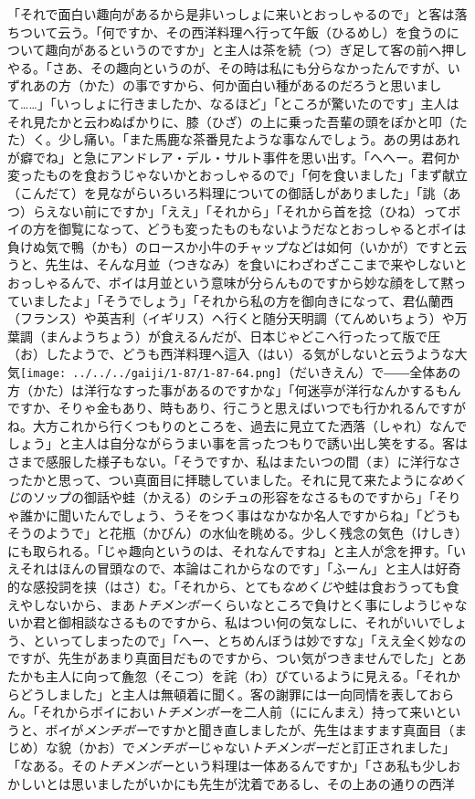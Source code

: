 「それで面白い趣向があるから是非いっしょに来いとおっしゃるので」と客は落ちついて云う。「何ですか、その西洋料理へ行って午飯（ひるめし）を食うのについて趣向があるというのですか」と主人は茶を続（つ）ぎ足して客の前へ押しやる。「さあ、その趣向というのが、その時は私にも分らなかったんですが、いずれあの方（かた）の事ですから、何か面白い種があるのだろうと思いまして\ldots{}\ldots{}」「いっしょに行きましたか、なるほど」「ところが驚いたのです」主人はそれ見たかと云わぬばかりに、膝（ひざ）の上に乗った吾輩の頭をぽかと叩（たた）く。少し痛い。「また馬鹿な茶番見たような事なんでしょう。あの男はあれが癖でね」と急にアンドレア・デル・サルト事件を思い出す。「へへー。君何か変ったものを食おうじゃないかとおっしゃるので」「何を食いました」「まず献立（こんだて）を見ながらいろいろ料理についての御話しがありました」「誂（あつ）らえない前にですか」「ええ」「それから」「それから首を捻（ひね）ってボイの方を御覧になって、どうも変ったものもないようだなとおっしゃるとボイは負けぬ気で鴨（かも）のロースか小牛のチャップなどは如何（いかが）ですと云うと、先生は、そんな月並（つきなみ）を食いにわざわざここまで来やしないとおっしゃるんで、ボイは月並という意味が分らんものですから妙な顔をして黙っていましたよ」「そうでしょう」「それから私の方を御向きになって、君仏蘭西（フランス）や英吉利（イギリス）へ行くと随分天明調（てんめいちょう）や万葉調（まんようちょう）が食えるんだが、日本じゃどこへ行ったって版で圧（お）したようで、どうも西洋料理へ這入（はい）る気がしないと云うような大気\texttt{[image: ../../../gaiji/1-87/1-87-64.png]}（だいきえん）で――全体あの方（かた）は洋行なすった事があるのですかな」「何迷亭が洋行なんかするもんですか、そりゃ金もあり、時もあり、行こうと思えばいつでも行かれるんですがね。大方これから行くつもりのところを、過去に見立てた洒落（しゃれ）なんでしょう」と主人は自分ながらうまい事を言ったつもりで誘い出し笑をする。客はさまで感服した様子もない。「そうですか、私はまたいつの間（ま）に洋行なさったかと思って、つい真面目に拝聴していました。それに見て来たように\emph{なめくじ}のソップの御話や蛙（かえる）のシチュの形容をなさるものですから」「そりゃ誰かに聞いたんでしょう、うそをつく事はなかなか名人ですからね」「どうもそうのようで」と花瓶（かびん）の水仙を眺める。少しく残念の気色（けしき）にも取られる。「じゃ趣向というのは、それなんですね」と主人が念を押す。「いえそれはほんの冒頭なので、本論はこれからなのです」「ふーん」と主人は好奇的な感投詞を挟（はさ）む。「それから、とても\emph{なめくじ}や蛙は食おうっても食えやしないから、まあ\emph{トチメンボー}くらいなところで負けとく事にしようじゃないか君と御相談なさるものですから、私はつい何の気なしに、それがいいでしょう、といってしまったので」「へー、とちめんぼうは妙ですな」「ええ全く妙なのですが、先生があまり真面目だものですから、つい気がつきませんでした」とあたかも主人に向って麁忽（そこつ）を詫（わ）びているように見える。「それからどうしました」と主人は無頓着に聞く。客の謝罪には一向同情を表しておらん。「それからボイにおい\emph{トチメンボー}を二人前（ににんまえ）持って来いというと、ボイが\emph{メンチボー}ですかと聞き直しましたが、先生はますます真面目（まじめ）な貌（かお）で\emph{メンチボー}じゃない\emph{トチメンボー}だと訂正されました」「なある。その\emph{トチメンボー}という料理は一体あるんですか」「さあ私も少しおかしいとは思いましたがいかにも先生が沈着であるし、その上あの通りの西洋